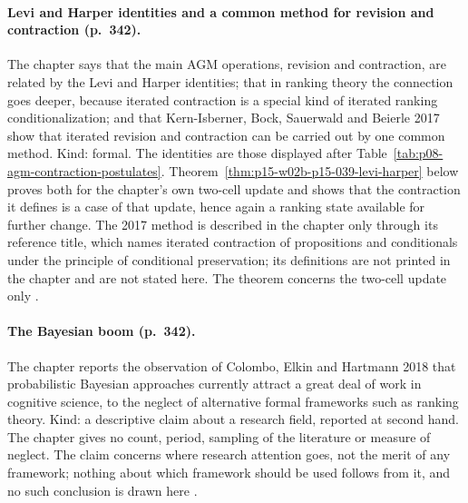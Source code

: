 \paragraph{Levi and Harper identities and a common method for revision and contraction (p.~342).}
The chapter says that the main AGM operations, revision and contraction, are
related by the Levi and Harper identities; that in ranking theory the
connection goes deeper, because iterated contraction is a special kind of
iterated ranking conditionalization; and that Kern-Isberner, Bock, Sauerwald
and Beierle 2017 show that iterated revision and contraction can be carried
out by one common method.  Kind: formal.  The identities are those displayed
after Table~\ref{tab:p08-agm-contraction-postulates}.
Theorem~\ref{thm:p15-w02b-p15-039-levi-harper} below proves both for the
chapter's own two-cell update and shows that the contraction it defines is a
case of that update, hence again a ranking state available for further
change.  The 2017 method is described in the chapter only through its
reference title, which names iterated contraction of propositions and
conditionals under the principle of conditional preservation; its
definitions are not printed in the chapter and are not stated here.  The
theorem concerns the two-cell update only
\parencite[pp.~342, 344]{KernIsbernerSkovgaardOlsenSpohn2021Ranking}.

\paragraph{The Bayesian boom (p.~342).}
The chapter reports the observation of Colombo, Elkin and Hartmann 2018 that
probabilistic Bayesian approaches currently attract a great deal of work in
cognitive science, to the neglect of alternative formal frameworks such as
ranking theory.  Kind: a descriptive claim about a research field, reported
at second hand.  The chapter gives no count, period, sampling of the
literature or measure of neglect.  The claim concerns where research
attention goes, not the merit of any framework; nothing about which
framework should be used follows from it, and no such conclusion is drawn
here \parencite[p.~342]{KernIsbernerSkovgaardOlsenSpohn2021Ranking}.

